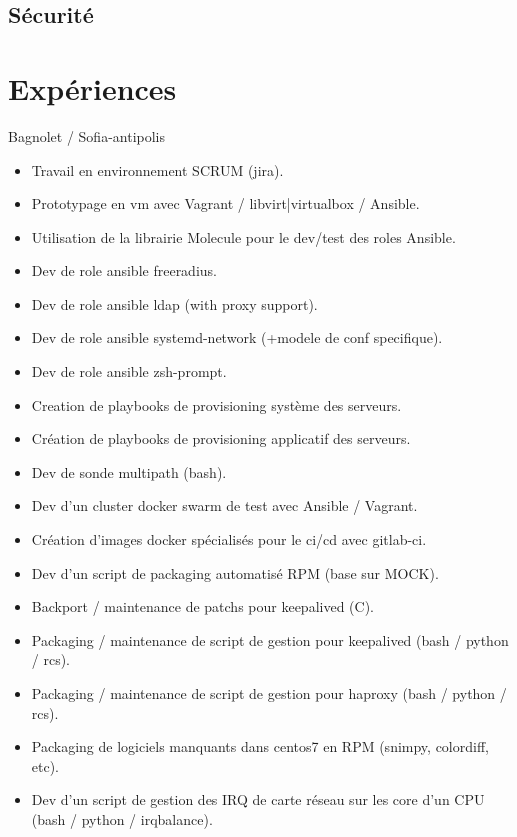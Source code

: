 \documentclass[10pt,a4paper,sans]{moderncv}
\begin{document}
\subsection{Sécurité}

\section{Expériences}

{Bagnolet / Sofia-antipolis}{
  \begin{itemize}%
    \item Travail en environnement SCRUM (jira).
    \item Prototypage en vm avec Vagrant / libvirt|virtualbox / Ansible.
    \item Utilisation de la librairie Molecule pour le dev/test des roles Ansible.
    \item Dev de role ansible freeradius.
    \item Dev de role ansible ldap (with proxy support).
    \item Dev de role ansible systemd-network (+modele de conf specifique).
    \item Dev de role ansible zsh-prompt.
    \item Creation de playbooks de provisioning système des serveurs.
    \item Création de playbooks de provisioning applicatif des serveurs.
    \item Dev de sonde multipath (bash).
    \item Dev d'un cluster docker swarm de test avec Ansible / Vagrant.
    \item Création d'images docker spécialisés pour le ci/cd avec gitlab-ci.
    \item Dev d'un script de packaging automatisé RPM (base sur MOCK).
    \item Backport / maintenance de patchs pour keepalived (C).
    \item Packaging / maintenance de script de gestion pour keepalived (bash / python / rcs).
    \item Packaging / maintenance de script de gestion pour haproxy (bash / python / rcs).
    \item Packaging de logiciels manquants dans centos7 en RPM (snimpy, colordiff, etc).
    \item Dev d'un script de gestion des IRQ de carte réseau sur les core d'un CPU (bash / python / irqbalance).

\end{itemize}}
\end{document}
